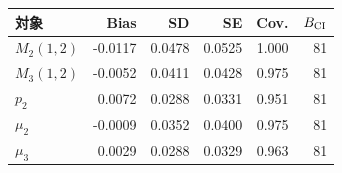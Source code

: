 \begin{tabular}{@{}lrrrrr@{}}
\hline
対象 & Bias & SD & SE & Cov. & $B_{\rm CI}$\\
\hline
$M_2(1,2)$ & -0.0117 & 0.0478 & 0.0525 & 1.000 & 81\\
$M_3(1,2)$ & -0.0052 & 0.0411 & 0.0428 & 0.975 & 81\\
$p_2$ & 0.0072 & 0.0288 & 0.0331 & 0.951 & 81\\
$\mu_2$ & -0.0009 & 0.0352 & 0.0400 & 0.975 & 81\\
$\mu_3$ & 0.0029 & 0.0288 & 0.0329 & 0.963 & 81\\
\hline
\end{tabular}
